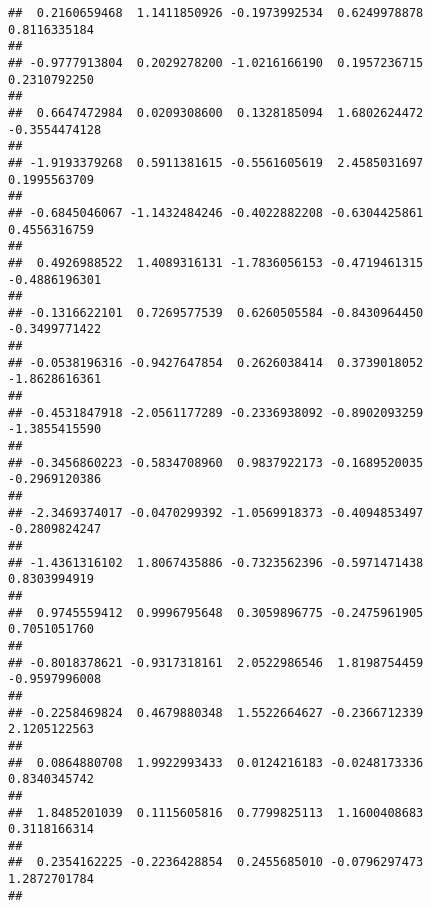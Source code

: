 \documentclass[]{article}
\begin{document}
\begin{verbatim}
##  0.2160659468  1.1411850926 -0.1973992534  0.6249978878  0.8116335184 
##                                                                       
## -0.9777913804  0.2029278200 -1.0216166190  0.1957236715  0.2310792250 
##                                                                       
##  0.6647472984  0.0209308600  0.1328185094  1.6802624472 -0.3554474128 
##                                                                       
## -1.9193379268  0.5911381615 -0.5561605619  2.4585031697  0.1995563709 
##                                                                       
## -0.6845046067 -1.1432484246 -0.4022882208 -0.6304425861  0.4556316759 
##                                                                       
##  0.4926988522  1.4089316131 -1.7836056153 -0.4719461315 -0.4886196301 
##                                                                       
## -0.1316622101  0.7269577539  0.6260505584 -0.8430964450 -0.3499771422 
##                                                                       
## -0.0538196316 -0.9427647854  0.2626038414  0.3739018052 -1.8628616361 
##                                                                       
## -0.4531847918 -2.0561177289 -0.2336938092 -0.8902093259 -1.3855415590 
##                                                                       
## -0.3456860223 -0.5834708960  0.9837922173 -0.1689520035 -0.2969120386 
##                                                                       
## -2.3469374017 -0.0470299392 -1.0569918373 -0.4094853497 -0.2809824247 
##                                                                       
## -1.4361316102  1.8067435886 -0.7323562396 -0.5971471438  0.8303994919 
##                                                                       
##  0.9745559412  0.9996795648  0.3059896775 -0.2475961905  0.7051051760 
##                                                                       
## -0.8018378621 -0.9317318161  2.0522986546  1.8198754459 -0.9597996008 
##                                                                       
## -0.2258469824  0.4679880348  1.5522664627 -0.2366712339  2.1205122563 
##                                                                       
##  0.0864880708  1.9922993433  0.0124216183 -0.0248173336  0.8340345742 
##                                                                       
##  1.8485201039  0.1115605816  0.7799825113  1.1600408683  0.3118166314 
##                                                                       
##  0.2354162225 -0.2236428854  0.2455685010 -0.0796297473  1.2872701784 
##                                                                       

\end{verbatim}
\end{document}
